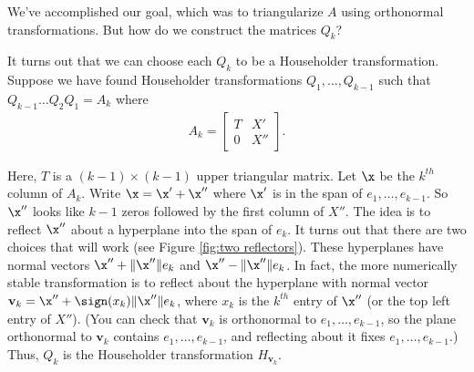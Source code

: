 We've accomplished our goal, which was to triangularize $A$ using orthonormal transformations.
But how do we construct the matrices $Q_k$?

It turns out that we can choose each $Q_k$ to be a Householder transformation.
Suppose we have found Householder transformations $Q_1, \ldots, Q_{k-1}$ such that $Q_{k-1}\ldots Q_2Q_1 = A_k$ where
%
\begin{align*}
A_k =
\left[\begin{array}{cc}
T & X' \\
0 & X''
\end{array}\right].
\end{align*}

Here, $T$ is a $(k-1) \times (k-1)$ upper triangular matrix.
Let $\x$ be the $k^{th}$ column of $A_k$.
Write $\x = \x' + \x''$ where $\x'$ is in the span of $e_1, \ldots, e_{k-1}$.
So $\x''$ looks like $k-1$ zeros followed by the first column of $X''$.
The idea is to reflect $\x''$ about a hyperplane into the span of $e_k$.
It turns out that there are two choices that will work (see Figure \ref{fig:two reflectors}).
These hyperplanes have normal vectors $\x'' + \| \x'' \|e_k$ and $\x'' - \| \x'' \|e_k$.
In fact, the more numerically stable transformation is to reflect about the hyperplane with normal vector $\mathbf{v}_k = \x'' +\sign(x_k) \| \x'' \|e_k$, where $x_k$ is the $k^{th}$ entry of $\x''$ (or the top left entry of $X''$).
(You can check that $\mathbf{v}_k$ is orthonormal to $e_1, \ldots, e_{k-1}$, so the plane orthonormal to $\mathbf{v}_k$ contains $e_1, \ldots, e_{k-1}$, and reflecting about it fixes $e_1, \ldots, e_{k-1}$.)
Thus, $Q_k$ is the Householder transformation $H_{\mathbf{v}_k}$.


